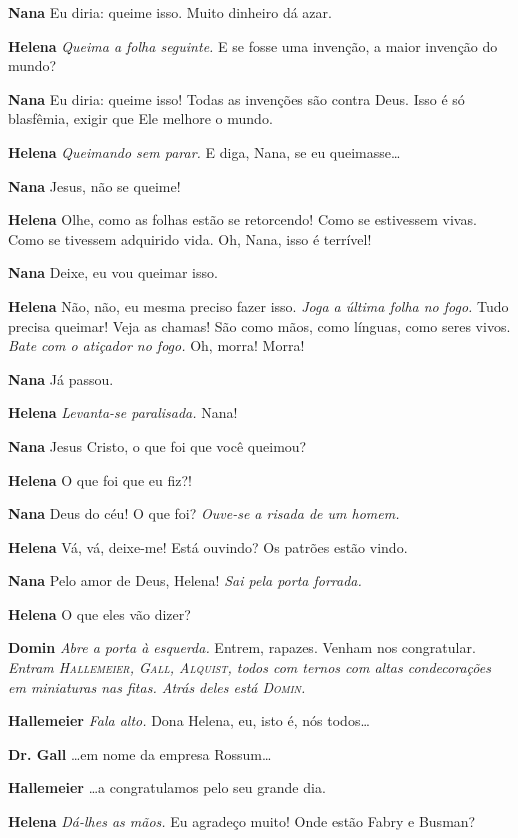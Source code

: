 \textbf{Nana} Eu diria: queime isso. Muito dinheiro dá azar.

\textbf{Helena} \emph{Queima a folha seguinte.} E se fosse uma invenção, a maior
invenção do mundo?

\textbf{Nana} Eu diria: queime isso! Todas as invenções são contra Deus. Isso é só
blasfêmia, exigir que Ele melhore o mundo.

\textbf{Helena} \emph{Queimando sem parar.} E diga, Nana, se eu queimasse\ldots{}

\textbf{Nana} Jesus, não se queime!

\textbf{Helena} Olhe, como as folhas estão se retorcendo! Como se estivessem vivas. Como
se tivessem adquirido vida. Oh, Nana, isso é terrível!

\textbf{Nana} Deixe, eu vou queimar isso.

\textbf{Helena} Não, não, eu mesma preciso fazer isso. \emph{Joga a última folha no
fogo.} Tudo precisa queimar! Veja as chamas! São como mãos, como línguas,
como seres vivos. \emph{Bate com o atiçador no fogo.} Oh, morra! Morra!

\textbf{Nana} Já passou.

\textbf{Helena} \emph{Levanta-se paralisada.} Nana!

\textbf{Nana} Jesus Cristo, o que foi que você queimou?

\textbf{Helena} O que foi que eu fiz?!

\textbf{Nana} Deus do céu! O que foi?
\emph{Ouve-se a risada de um homem.}

\textbf{Helena} Vá, vá, deixe-me! Está ouvindo? Os patrões estão vindo.

\textbf{Nana} Pelo amor de Deus, Helena! \emph{Sai pela porta forrada.}

\textbf{Helena} O que eles vão dizer?

\textbf{Domin} \emph{Abre a porta à esquerda.} Entrem, rapazes. Venham nos
congratular. \emph{Entram \textsc{Hallemeier}, \textsc{Gall},
\textsc{\mbox{Alquist}}, todos com ternos com altas condecorações em
miniaturas nas fitas. Atrás deles está \textsc{Domin}.}

\textbf{Hallemeier} \emph{Fala alto.} Dona Helena, eu, isto é, nós todos\ldots{}

\textbf{Dr. Gall} \ldots{}em nome da empresa Rossum\ldots{}

\textbf{Hallemeier} \ldots{}a congratulamos pelo seu grande dia.

\textbf{Helena} \emph{Dá-lhes as mãos.} Eu agradeço muito! Onde estão Fabry e Busman?

